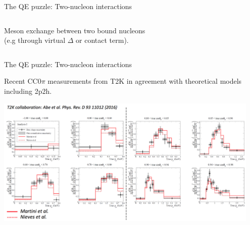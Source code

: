 \begin{frame}{The QE puzzle: Two-nucleon interactions}
\begin{columns}
\begin{column}{0.30\textwidth}
\begin{center}
        {\scriptsize
          Meson exchange between two bound nucleons\\
         (e.g through virtual $\Delta$ or contact term).
        }
     \end{center}
    \end{column}
  \end{columns}

\end{frame}

%
%
%
\begin{frame}{The QE puzzle: Two-nucleon interactions}

{\small
  Recent CC0$\pi$ measurements from T2K in agreement with
  theoretical models including 2p2h.\\}

  \begin{center}
     \includegraphics[width=0.95\textwidth]{./images/nuint/ccqe/t2k_cc0pi.png}\\
  \end{center}
\end{frame}

